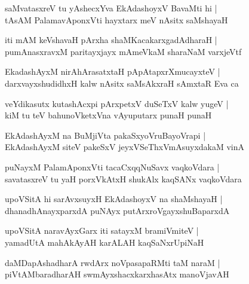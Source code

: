 \documentclass[twoside,12pt,openright]{book}
\newcounter{shloka}[chapter]
\begin{document}
\begin{shloka}%
saMvatasxreV tu yAshecxYva EkAdashoyxV BavaMti hi |\\
tAsAM PalamavAponxVti hayxtarx meV nAsitx saMshayaH
\end{shloka}

\begin{shloka}%
iti mAM keVshavaH pArxha shaMKacakarxgadAdharaH |\\
pumAnasxravxM paritayxjayx mAmeVkaM sharaNaM varxjeVtf
\end{shloka}

\begin{shloka}%
EkadashAyxM nirAhArasatxtaH pApAtapxrXmucayxteV |\\
darxvayxshudidhxH kalw nAsitx saMsAkxraH sAmxtaR Eva ca 
\end{shloka}

\begin{shloka}%
veYdikasutx kutashAcxpi pArxpetxV duSeTxV kalw yugeV |\\
kiM tu teV bahunoVketxVna vAyuputarx punaH punaH 
\end{shloka}

\begin{shloka}%
EkAdashAyxM na BuMjiVta pakaSxyoVruBayoVrapi |\\
EkAdashAyxM siteV pakeSxV jeyxVSeThxVmAsuyxdakaM vinA
\end{shloka}

\begin{shloka}%
puNayxM PalamAponxVti tacaCxqqNuSavx vaqkoVdara |\\
savatasxreV tu yaH porxVkAtxH shukAlx kaqSANx vaqkoVdara
\end{shloka}

\begin{shloka}%
upoVSitA hi sarAvxsuyxH EkAdashoyxV na shaMshayaH |\\
dhanadhAnayxparxdA puNAyx putArxroVgayxshuBaparxdA
\end{shloka}

\begin{shloka}%
upoVSitA naravAyxGarx iti satayxM bramiVmiteV |\\
yamadUtA mahAkAyAH karALAH kaqSaNxrUpiNaH 
\end{shloka}

\begin{shloka}%
daMDapAshadharA rwdArx noVpasapaRMti taM naraM |\\
piVtAMbaradharAH swmAyxshacxkarxhasAtx manoVjavAH 
\end{shloka}
\end{document}
